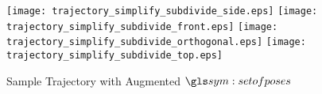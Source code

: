 		\begin{figure}[hb]
			\centering
			\begin{minipage}{0.8\linewidth}
				\texttt{[image: trajectory\_simplify\_subdivide\_side.eps]}
				\texttt{[image: trajectory\_simplify\_subdivide\_front.eps]}
				\texttt{[image: trajectory\_simplify\_subdivide\_orthogonal.eps]}
				\texttt{[image: trajectory\_simplify\_subdivide\_top.eps]}
			\end{minipage}
			\caption{Sample Trajectory with Augmented $\setofposes$}
			\label{fig:sample_trajectory_with_augmented_set_of_poses}
		\end{figure}
